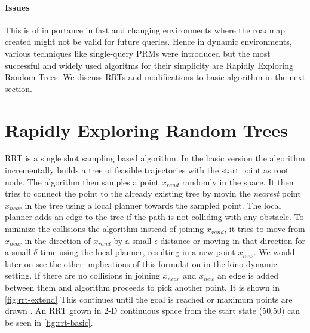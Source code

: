 \documentclass[MTech]{iitmdiss}
\begin{document}
\subsubsection*{Issues}
 This is of importance in fast and changing environments where the roadmap created might not be valid for future queries. Hence in dynamic environments, various techniques like single-query PRMs were introduced but the most successful and widely used algoritms for their simplicity are Rapidly Exploring Random Trees. We discuss RRTs and modifications to basic algorithm in the next section.  

\chapter{Rapidly Exploring Random Trees}

RRT is a single shot sampling based algorithm. In the basic version the algorithm incrementally builds a tree of feasible trajectories with the start point as root node. The algorithm then samples a point $x_{rand}$ randomly in the space. It then tries to connect the point to the already existing tree by movin the \emph{nearest} point $x_{near}$ in the tree using a local planner towards the sampled point. The local planner adds an edge to the tree if the path is not colliding with any obstacle. To mininize the collisions the algorithm instead of joining $x_{rand}$, it tries to move from $x_{near}$ in the direction of $x_{rand}$ by a small $\epsilon$-distance or moving in that direction for a small $\delta$-time using the local planner, resulting in a new point $x_{new}$. We would later on see the other implications of this formulation in the kino-dynamic setting. If there are no collisions in joining $x_{near}$ and $x_{new}$ an edge is added between them and algorithm proceeds to pick another point. It is shown in \ref{fig:rrt-extend} This continues until the goal is reached or maximum points are drawn . An RRT grown in 2-D continuous space from the start state (50,50) can be seen in \ref{fig:rrt-basic}.
\end{document}
